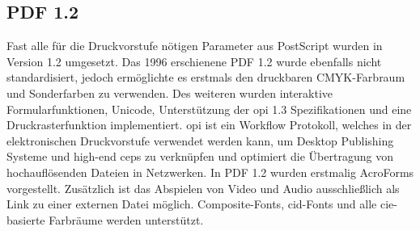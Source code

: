 \subsection{PDF 1.2}
Fast alle für die Druckvorstufe nötigen Parameter aus PostScript wurden in Version 1.2 umgesetzt. Das 1996 erschienene PDF 1.2 wurde ebenfalls nicht standardisiert, jedoch ermöglichte es erstmals den druckbaren CMYK-Farbraum und Sonderfarben zu verwenden. Des weiteren wurden interaktive Formularfunktionen, Unicode, Unterstützung der \gls{opi} 1.3 Spezifikationen und eine Druckrasterfunktion implementiert. \cite{proj-consult} \gls{opi} ist ein Workflow Protokoll, welches in der elektronischen Druckvorstufe verwendet werden kann, um Desktop Publishing Systeme und high-end \gls{ceps} zu verknüpfen und optimiert die Übertragung von hochauflösenden Dateien in Netzwerken. \cite{printwiki} In PDF 1.2 wurden erstmalig AcroForms vorgestellt. Zusätzlich ist das Abspielen von Video und Audio ausschließlich als Link zu einer externen Datei möglich. Composite-Fonts, \gls{cid}-Fonts und alle \gls{cie}-basierte Farbräume werden unterstützt.
\cite{schneeberger} 

